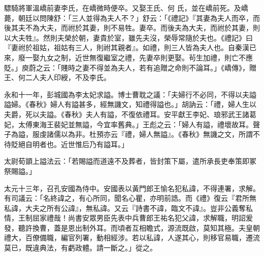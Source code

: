 \begin{pinyinscope}
 驃騎將軍溫嶠前妻李氏，在嶠微時便卒。又娶王氏、何
 氏，並在嶠前死。及嶠薨，朝廷以問陳舒：「三人並得為夫人不？」舒云：「《禮記》『其妻為夫人而卒，而後其夫不為大夫，而祔於其妻，則不易牲。妻卒。而後夫為大夫，而祔於其妻，則以大夫牲』。然則夫榮於朝，妻貴於室，雖先夫沒，榮辱常隨於夫也。《禮記》曰『妻祔於祖姑，祖姑有三人，則祔其親者』。如禮，則三人皆為夫人也。自秦漢已來，廢一娶九女之制，近世無復繼室之禮，先妻卒則更娶。茍生加禮，則亡不應貶。」庾蔚之云：「賤時之妻不得並為夫人，若有追贈之命則不論耳。」《嶠傳》，贈王、何二人夫人印綬，不及李氏。



 永和十一年，彭城國為李太妃求謚。博士曹耽之議：「夫婦行不必同，不得以夫謚謚婦。《春秋》婦人有謚甚多，經無譏文，知禮得謚也。」胡訥云：「禮，婦人生以夫爵，死以夫謚。《春秋》夫人有謚，不復依禮耳。安平獻王李妃、琅邪武王諸葛妃，太傅東海王裴妃並無謚，今宜率舊典。」王彪之云：「婦人有謚，禮壞故耳。聲子為謚，服虔諸儒以為非。杜預亦云『禮，婦人無謚』。《春秋》無譏之文，所謂不待貶絕自明者也。近世惟后乃有謚耳。」



 太尉荀顗上謚法云：「若賜謚而道遠不及葬者，皆封策下屬，遣所承長吏奉策即冢祭賜謚。」



 太元十三年，召孔安國為侍中。安國表以黃門郎王愉名犯私諱，不得連署，求解。有司議云：「名終諱之，有心所同，聞名心瞿，亦明前誥。而《禮》復云『君所無私諱，大夫之所有公諱』，無私諱。又云『詩書不諱，臨文不諱』。豈非公義奪私情，王制屈家禮哉！尚書安眾男臣先表中兵曹郎王祐名犯父諱，求解職，明詔爰發，聽許換曹，蓋是恩出制外耳。而頃者互相瞻式，源流既啟，莫知其極。夫皇朝禮大，百僚備職，編官列署，動相經涉。若以私諱，人遂其心，則移官易職，遷流莫已，既違典法，有虧政體。請一斷之。」從之。



\end{pinyinscope}